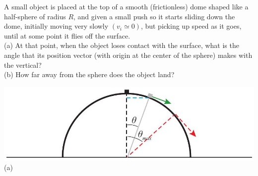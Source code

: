 \documentclass[10pt]{article}
\begin{document}
A small object is placed at the top of a smooth (frictionless) dome shaped like a half-sphere of radius $R$, and given a small push so it starts sliding down the dome, initially moving very slowly $\left(v_{i} \simeq 0\right)$, but picking up speed as it goes, until at some point it flies off the surface.\\
(a) At that point, when the object loses contact with the surface, what is the angle that its position vector (with origin at the center of the sphere) makes with the vertical?\\
(b) How far away from the sphere does the object land?

\includegraphics[max width=\textwidth, center]{2024_09_14_9969b06773f10b6936e8g-197(1)}\\
(a)
\end{document}
